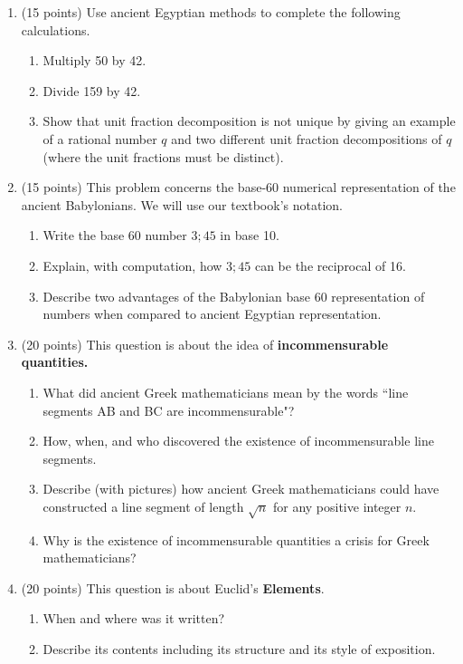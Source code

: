 \documentclass[12pt]{article}
\renewcommand{\emph}[1]{\textsf{\textbf{#1}}}
\newcommand{\be}{\begin{enumerate}}
\newcommand{\ee}{\end{enumerate}}
\begin{document}
\vfill
\newpage
\be
\item (15 points) Use ancient Egyptian methods to complete the following calculations.
	\begin{enumerate}
	\item Multiply 50 by 42.
	\vfill
	\item Divide 159 by 42.
	\vfill
	\item Show that unit fraction decomposition is not unique by giving an example of a rational number $q$ and two different unit fraction decompositions of $q$ (where the unit fractions must be distinct).
	\vfill
	\ee
\newpage
\item (15 points) This problem concerns the base-60 numerical representation of the ancient Babylonians. We will use our textbook's notation.
	\be
	\item Write the base 60 number $3;45$ in base 10.
	\vfill
	\item Explain, with computation, how $3;45$ can be the reciprocal of 16.
	\vfill
	\item Describe two advantages of the Babylonian base 60 representation of numbers when compared to ancient Egyptian representation.
	\vfill
	\ee
\newpage
\item (20 points) This question is about the idea of \textbf{incommensurable quantities.} 
	\begin{enumerate}
	\item What did ancient Greek mathematicians mean by the words ``line segments AB and BC are incommensurable"?
	\vfill
	\item How, when, and who discovered the existence of incommensurable line segments.
	\vfill 
	\item Describe (with pictures) how ancient Greek mathematicians could have constructed a line segment of length $\sqrt{n}$ for any positive integer $n.$
	\vfill
	\item Why is the existence of incommensurable quantities a crisis for Greek mathematicians?
	\vfill
	\end{enumerate}
\newpage
 \item (20 points) This question is about Euclid's \emph{Elements}.
	\begin{enumerate}
	\item When and where was it written?\\
	\vspace{.5in}
	\item Describe its contents including its structure and its style of exposition.\\
	\vfill
	

\end{enumerate}
\end{enumerate}
\end{document}
